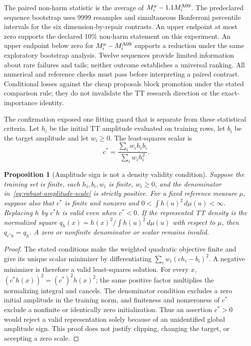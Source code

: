 \documentclass[11pt]{article}
\newtheorem{proposition}{Proposition}
\begin{document}
The paired non-harm statistic is the average of
$M_i^a-1.1M_i^{\rm A09}$. The predeclared sequence bootstrap uses 9999
resamples and simultaneous Bonferroni percentile intervals for the six
dimension-by-repair contrasts. An upper endpoint at most zero supports the
declared 10\% non-harm statement on this experiment. An upper endpoint below
zero for $M_i^a-M_i^{\rm A09}$ supports a reduction under the same exploratory
bootstrap analysis. Twelve sequences provide limited information about
rare failures and tails; neither outcome establishes a universal ranking.
All numerical and reference checks must pass before interpreting a paired
contrast. Conditional losses against the cheap proposals block promotion
under the stated comparison rule; they do not invalidate the TT research
direction or the exact-importance identity.

The confirmation exposed one fitting guard that is separate from these
statistical criteria. Let $h_i$ be the initial TT amplitude evaluated on
training rows, let $b_i$ be the target amplitude and let $w_i\ge0$. The
least-squares scalar is
\begin{equation}
 c^*=\frac{\sum_i w_i h_i b_i}{\sum_i w_i h_i^2}.
 \label{eq:robust-amplitude-scale}
\end{equation}
\begin{proposition}[Amplitude sign is not a density validity condition]
\label{prop:robust-amplitude-sign}
Suppose the training set is finite, each $h_i,b_i,w_i$ is finite, $w_i\ge0$,
and the denominator in~\eqref{eq:robust-amplitude-scale} is strictly positive.
For a fixed reference measure $\mu$, suppose also that $c^*$ is finite and
nonzero and $0<\int h(u)^2\,d\mu(u)<\infty$. Replacing $h$ by
$c^*h$ is valid even when $c^*<0$. If the represented TT density is the
normalized square $q_h(x)=h(x)^2/\int h(u)^2\,d\mu(u)$ with respect to
$\mu$, then
$q_{c^*h}=q_h$. A zero or nonfinite denominator or scalar remains invalid.
\end{proposition}
\begin{proof}
The stated conditions make the weighted quadratic objective finite and give
its unique scalar minimizer by differentiating
$\sum_iw_i(c h_i-b_i)^2$. A negative minimizer is therefore a valid
least-squares solution. For every $x$,
$(c^*h(x))^2=(c^*)^2h(x)^2$; the same positive factor multiplies the
normalizing integral and cancels. The denominator condition excludes a zero
initial amplitude in the training norm, and finiteness and nonzeroness of
$c^*$ exclude a nonfinite or identically zero initialization. Thus an
assertion $c^*>0$ would reject a valid representation solely because of an
unidentified global amplitude sign. This proof does not justify clipping,
changing the target, or accepting a zero scale.
\end{proof}
\end{document}
